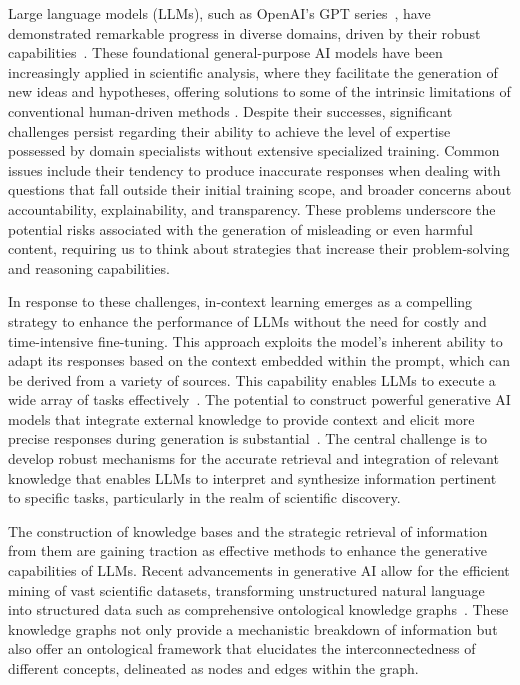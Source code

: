 \documentclass{article}
\begin{document}
Large language models (LLMs), such as OpenAI's GPT series~\cite{OpenAI2023}, have demonstrated remarkable progress in diverse domains, driven by their robust capabilities~\cite{vaswani2017attention, wei2022emergent, touvron2023llama, teubner2023welcome, zhao2023survey}. These foundational general-purpose AI models \cite{chowdhery2023palm, gunasekar2023textbooks, jiang2023mistral, OpenAI2023} have been increasingly applied in scientific analysis, where they facilitate the generation of new ideas and hypotheses, offering solutions to some of the intrinsic limitations of conventional human-driven methods \cite{girotra2023ideas, Buehler2023ontologic, jablonka202314, m2024augmenting, luu2024bioinspiredllm,lu2024finetuninglargelanguagemodels, buehler2024cephalo}. Despite their successes, significant challenges persist regarding their ability to achieve the level of expertise possessed by domain specialists without extensive specialized training. Common issues include their tendency to produce inaccurate responses when dealing with questions that fall outside their initial training scope, and broader concerns about accountability, explainability, and transparency. These problems underscore the potential risks associated with the generation of misleading or even harmful content, requiring us to think about strategies that increase their problem-solving and reasoning capabilities.

In response to these challenges, in-context learning emerges as a compelling strategy to enhance the performance of LLMs without the need for costly and time-intensive fine-tuning. This approach exploits the model's inherent ability to adapt its responses based on the context embedded within the prompt, which can be derived from a variety of sources. This capability enables LLMs to execute a wide array of tasks effectively~\cite{wei2022chain, white2023prompt, zhou2022large}. The potential to construct powerful generative AI models that integrate external knowledge to provide context and elicit more precise responses during generation is substantial~\cite{sun2023think}. The central challenge is to develop robust mechanisms for the accurate retrieval and integration of relevant knowledge that enables LLMs to interpret and synthesize information pertinent to specific tasks, particularly in the realm of scientific discovery.

The construction of knowledge bases and the strategic retrieval of information from them are gaining traction as effective methods to enhance the generative capabilities of LLMs. Recent advancements in generative AI allow for the efficient mining of vast scientific datasets, transforming unstructured natural language into structured data such as comprehensive ontological knowledge graphs~\cite{shetty2023general, pan2024unifying, buehler2024accelerating, dagdelen2024structured, schilling2024text}. These knowledge graphs not only provide a mechanistic breakdown of information but also offer an ontological framework that elucidates the interconnectedness of different concepts, delineated as nodes and edges within the graph.
\end{document}
